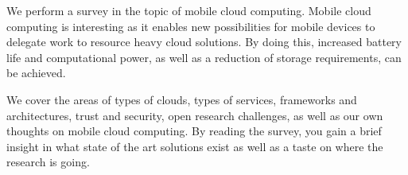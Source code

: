 We perform a survey in the topic of mobile cloud computing. 
Mobile cloud computing is interesting as it enables new possibilities for mobile devices to delegate work to resource heavy cloud solutions.
By doing this, increased battery life and computational power, as well as a reduction of storage requirements, can be achieved. 

We cover the areas of types of clouds, types of services, frameworks and architectures, trust and security, open research challenges, as well as our own thoughts on mobile cloud computing.
By reading the survey, you gain a brief insight in what state of the art solutions exist as well as a taste on where the research is going.